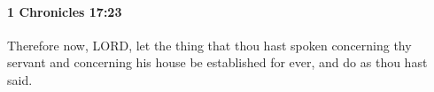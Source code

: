 
		\paragraph{1 Chronicles 17:23} %
			\label{1CHRONICLES-17-23}

			Therefore now, LORD, let the thing that thou hast spoken concerning thy servant and concerning his house be established for ever, and do as thou hast said.


